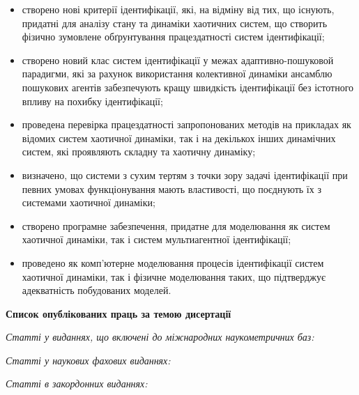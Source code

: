 \documentclass[a4paper,13pt]{atuaref}
\newcommand{\xsect}[1]{\medskip\begin{center}\textbf{#1}\end{center}\medskip\penalty10000}
\newcommand{\xxxsect}[1]{\smallskip\textit{#1}\smallskip\penalty10000}
\begin{document}
\begin{itemize}

  \item
    створено нові критерії ідентифікації, які, на відміну від тих, що
    існують, придатні для аналізу стану та динаміки
    хаотичних систем, що створить фізично зумовлене обґрунтування працездатності систем
    ідентифікації;

  \item
    створено новий клас систем ідентифікації у межах
    адаптивно-пошуковой парадигми,
    які за рахунок використання колективної динаміки
    ансамблю пошукових агентів забезпечують
    кращу швидкість ідентифікації без істотного впливу на похибку ідентифікації;

  \item
    проведена перевірка працездатності запропонованих методів
    на прикладах як відомих систем хаотичної динаміки,
    так і на декількох інших динамічних систем, які проявляють
    складну та хаотичну динаміку;

  \item
   визначено, що системи з сухим тертям з точки зору задачі ідентифікації
   при певних  умовах функціонування
   мають властивості, що поєднують їх з системами хаотичної динаміки;

 \item
  створено програмне забезпечення, придатне для моделювання як систем
  хаотичної динаміки, так і систем мультиагентної ідентифікації;

  \item
  проведено як комп'ютерне моделювання процесів ідентифікації систем
  хаотичної динаміки, так і фізичне моделювання таких, що підтверджує адекватність
  побудованих моделей.


\end{itemize}



\nocite{*}

\xsect{Список опублікованих праць за темою дисертації}

\xxxsect{Статті у виданнях, що включені до міжнародних наукометричних баз:}

\printbibliography[heading=none, keyword=scimetr]


\xxxsect{Статті у наукових фахових виданнях:}

\printbibliography[heading=none, keyword=vak]

\xxxsect{Статті в закордонних виданнях:}

\printbibliography[heading=none, keyword=foreign]
\end{document}
